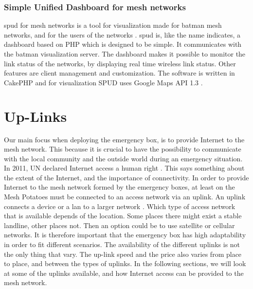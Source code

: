 \subsubsection{Simple Unified Dashboard for mesh networks}
\gls{spud} for mesh networks is a tool for visualization made for \gls{batman} mesh networks, and for the users of the networks \cite{spud}. \gls{spud} is, like the name indicates, a dashboard based on PHP which is designed to be simple. It communicates with the \gls{batman} visualization server. The dashboard makes it possible to monitor the link status of the networks, by displaying real time wireless link status. Other features are client management and customization. The software is written in CakePHP and for visualization SPUD uses Google Maps API 1.3 \cite{spud}.

\section{Up-Links}
Our main focus when deploying the emergency box, is to provide Internet to the mesh network. This because it is crucial to have the possibility to communicate with the local community and the outside world during an emergency situation. In 2011, UN declared Internet access a human right \cite{HR}. This says something about the extent of the Internet, and the importance of connectivity. In order to provide Internet to the mesh network formed by the emergency boxes, at least on the Mesh Potatoes must be connected to an access network via an uplink. An uplink connects a device or a \gls{lan} to a larger network \cite{uplink}. Which type of access network that is available depends of the location. Some places there might exist a stable landline, other places not. Then an option could be to use satellite or cellular networks. It is therefore important that the emergency box has high adaptability in order to fit different scenarios. The availability of the different uplinks is not the only thing that vary. The up-link speed and the price also varies from place to place, and between the types of uplinks. In the following sections, we will look at some of the uplinks available, and how Internet access can be provided to the mesh network.  

